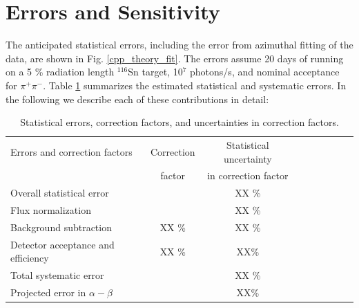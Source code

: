\section{Errors and Sensitivity}


The anticipated statistical errors, including the error from azimuthal fitting of the data, are shown in Fig. \ref{cpp_theory_fit}.
The errors assume 20 days of running on a 5 \% radiation length $^{116}$Sn target, 10$^7$ photons/s, and nominal acceptance for $\pi^+ \pi^-$.
Table \ref{errors} summarizes the estimated statistical and systematic errors. In the following we describe each of
these contributions in detail: 

\begin{table}[bt]
\caption{Statistical errors, correction factors, and uncertainties in correction factors.
\label{errors}
}
\begin{center}
\begin{tabular}{|l|c|c|c|c|c|c|c|c|}
\hline
\hline
    Errors and correction factors  &  Correction       & Statistical uncertainty    \\ 
                                                         &     factor            & in correction factor    \\  \hline \hline
  Overall statistical error  &      &  XX \%    \\ \hline
  Flux normalization &     &  XX \%     \\ \hline
  Background subtraction  & XX \% &  XX \%   \\ \hline
  Detector acceptance and efficiency &  XX \%   &   XX\%   \\ \hline
  Total systematic error &   & XX \% \\ \hline
  Projected error in $\alpha - \beta$ &   &  XX\%  \\ \hline
 \hline
 \hline
\end{tabular}
\end{center}
\end{table}


